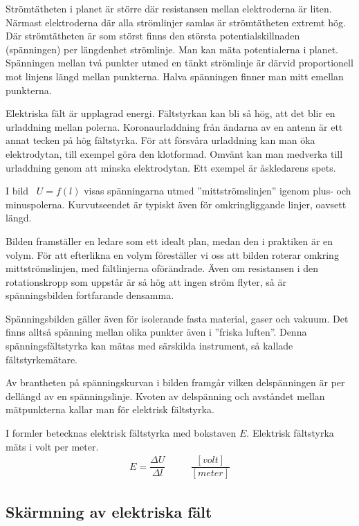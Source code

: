 Strömtätheten i planet är större där resistansen mellan elektroderna är liten.
Närmast elektroderna där alla strömlinjer samlas är strömtätheten extremt hög.
Där strömtätheten är som störst finns den största potentialskillnaden
(spänningen) per längdenhet strömlinje.
Man kan mäta potentialerna i planet.
Spänningen mellan två punkter utmed en tänkt strömlinje är därvid proportionell
mot linjens längd mellan punkterna.
Halva spänningen finner man mitt emellan punkterna.

Elektriska fält är upplagrad energi.
Fältstyrkan kan bli så hög, att det blir en urladdning mellan polerna.
Koronaurladdning från ändarna av en antenn är ett annat tecken på hög
fältstyrka.
För att försvåra urladdning kan man öka elektrodytan, till exempel göra den
klotformad.
Omvänt kan man medverka till urladdning genom att minska elektrodytan.
Ett exempel är åskledarens spets.

I bild~ \(U = f(l)\) visas spänningarna utmed
''mittströmslinjen'' igenom plus- och minuspolerna.
Kurvutseendet är typiskt även för omkringliggande linjer, oavsett längd.

Bilden framställer en ledare som ett idealt plan, medan den i praktiken är en
volym.
För att efterlikna en volym föreställer vi oss att bilden roterar omkring
mittströmslinjen, med fältlinjerna oförändrade.
Även om resistansen i den rotationskropp som uppstår är så hög att ingen ström
flyter, så är spänningsbilden fortfarande densamma.

Spänningsbilden gäller även för isolerande fasta material, gaser och vakuum.
Det finns alltså spänning mellan olika punkter även i ''friska luften''.
Denna spänningsfältstyrka kan mätas med särskilda instrument, så kallade
fältstyrkemätare.

Av brantheten på spänningskurvan i bilden framgår vilken delspänningen är per
dellängd av en spänningslinje.
Kvoten av delspänning och avståndet mellan mätpunkterna kallar man för
elektrisk fältstyrka.

I formler betecknas elektrisk fältstyrka med bokstaven \(E\).
Elektrisk fältstyrka mäts i volt per meter.
\[
\begin{array}{ccc}
E=\dfrac{\Delta U}{\Delta l} &\quad& \dfrac{[volt]}{[meter]}
\end{array}
\]
\subsection{Skärmning av elektriska fält}
\label{elektrostatik skärmning}

